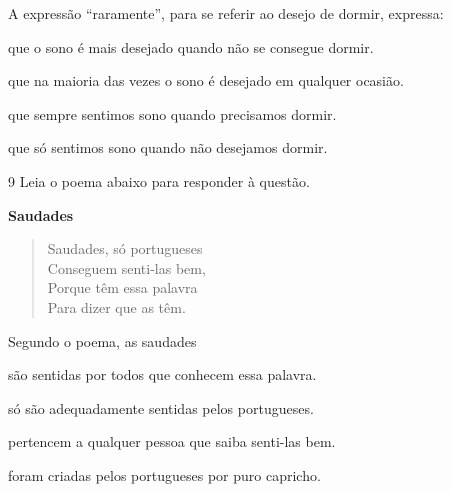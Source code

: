 A expressão ``raramente'', para se referir ao desejo de dormir, expressa:

\begin{escolha}
  
  \item que o sono é mais desejado quando não se consegue dormir.
  
  \item que na maioria das vezes o sono é desejado em qualquer ocasião.
  
  \item que sempre sentimos sono quando precisamos dormir.
  
  \item que só sentimos sono quando não desejamos dormir. 

\end{escolha}

\num{9} Leia o poema abaixo para responder à questão. 

\begin{myquote}




\textbf{Saudades}

\begin{verse}

Saudades, só portugueses \\
Conseguem senti-las bem, \\
Porque têm essa palavra \\
Para dizer que as têm.

\end{verse}


\end{myquote}

Segundo o poema, as saudades  

\begin{escolha}

  \item são sentidas por todos que conhecem essa palavra.
  
  \item só são adequadamente sentidas pelos portugueses.
  
  \item pertencem a qualquer pessoa que saiba senti-las bem.
  
  \item foram criadas pelos portugueses por puro capricho.

\end{escolha}


